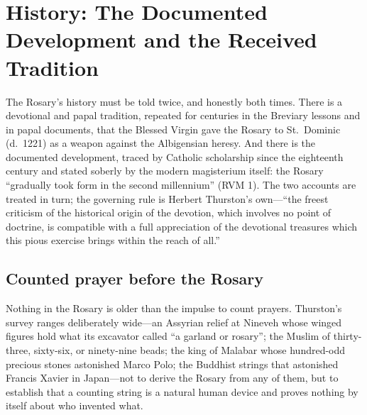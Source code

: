 \section{History: The Documented Development and the Received Tradition}
\label{sec:history}

The Rosary's history must be told twice, and honestly both times. There
is a devotional and papal tradition, repeated for centuries in the
Breviary lessons and in papal documents, that the Blessed Virgin gave
the Rosary to St.~Dominic (d.~1221) as a weapon against the Albigensian
heresy. And there is the documented development, traced by Catholic
scholarship since the eighteenth century and stated soberly by the
modern magisterium itself: the Rosary ``gradually took form in the
second millennium'' (RVM 1). The two accounts are treated in turn; the
governing rule is Herbert Thurston's own---``the freest criticism of the
historical origin of the devotion, which involves no point of doctrine,
is compatible with a full appreciation of the devotional treasures which
this pious exercise brings within the reach of all.''

\subsection{Counted prayer before the Rosary}

Nothing in the Rosary is older than the impulse to count prayers.
Thurston's survey ranges deliberately wide---an Assyrian relief at
Nineveh whose winged figures hold what its excavator called ``a garland
or rosary''; the Muslim  of thirty-three, sixty-six, or
ninety-nine beads; the king of Malabar whose hundred-odd precious
stones astonished Marco Polo; the Buddhist strings that astonished
Francis Xavier in Japan---not to derive the Rosary from any of them, but
to establish that a counting string is a natural human device and proves
nothing by itself about who invented what.

